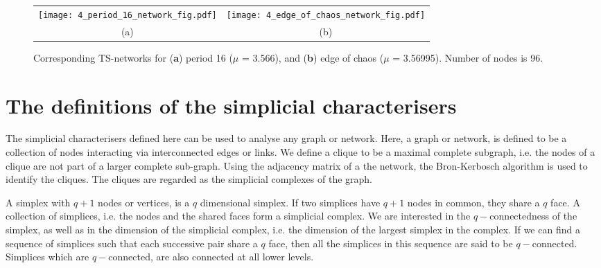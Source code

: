 \documentclass[aps,pre,superscriptaddress,groupedaddress,preprint]{revtex4}  %
\begin{document}
\begin{figure*}[!h]
	\begin{center}
		\begin{tabular}{cc}
			\texttt{[image: 4\_period\_16\_network\_fig.pdf]}
			&
			\texttt{[image: 4\_edge\_of\_chaos\_network\_fig.pdf]}\\
			(a) & (b)\\
		\end{tabular}{}
		\caption{Corresponding TS-networks for (\textbf{a}) period 16 ($\mu$ = 3.566), and (\textbf{b}) edge of chaos ($\mu$ = 3.56995). Number of nodes is 96.}
		\label{fig:networks}
	\end{center}
\end{figure*}

\label{sec:2}
\section{The definitions of the simplicial characterisers}

The simplicial characterisers defined here can be used to analyse any graph or network. Here, a graph or network, is defined to be a collection of nodes interacting via interconnected edges or links. We define a clique to be a maximal complete subgraph, i.e. the nodes of a clique are not part of a larger complete sub-graph. Using the adjacency matrix of a the network, the Bron-Kerbosch algorithm \cite{Bron} is used to identify the cliques. The cliques are regarded as the simplicial complexes of the graph. 

A simplex with $q+1$ nodes or vertices, is a $q$ dimensional simplex. If two simplices have $q+1$ nodes in common, they share a $q$ face. A collection of simplices, i.e. the nodes and the shared faces form a simplicial complex. We are interested in the $q-$connectedness of the simplex, as well as in the dimension of the simplicial complex, i.e. the dimension of the largest simplex in the complex. If we can find a sequence of simplices such that each successive pair share a $q$ face, then all the simplices in this sequence are said to be $q-$connected. Simplices which are $q-$connected, are also connected at all lower levels.  
\end{document}
